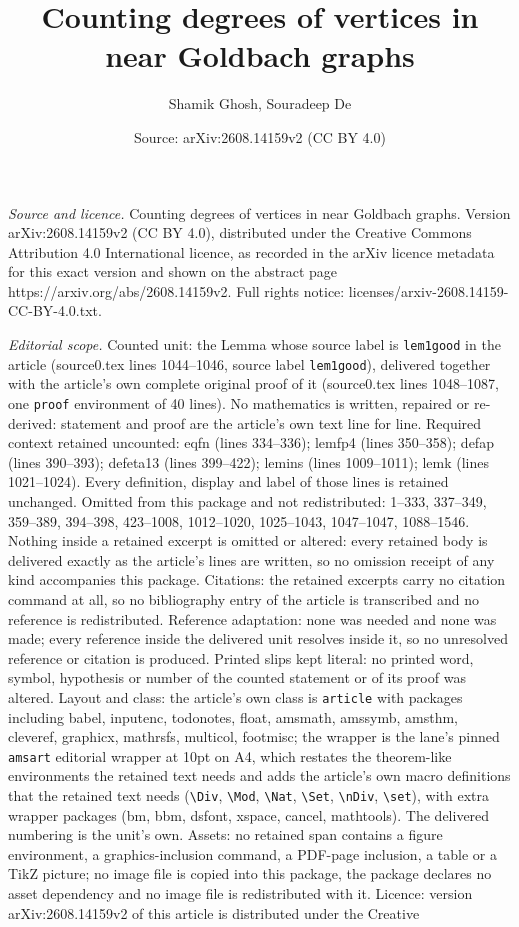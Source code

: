 \documentclass[10pt,a4paper]{amsart}
\title[Counting degrees of vertices in near Goldbach graphs]{Counting degrees of vertices in near Goldbach graphs}
\author{Shamik Ghosh, Souradeep De}
\date{Source: arXiv:2608.14159v2 (CC BY 4.0)}
\begin{document}
\maketitle

\noindent\emph{Source and licence.} Counting degrees of vertices in near Goldbach graphs. Version arXiv:2608.14159v2 (CC BY 4.0), distributed under the Creative Commons Attribution 4.0 International licence, as recorded in the arXiv licence metadata for this exact version and shown on the abstract page https://arxiv.org/abs/2608.14159v2. Full rights notice: licenses/arxiv-2608.14159-CC-BY-4.0.txt.\par\smallskip

\noindent\textit{Editorial scope.} Counted unit: the Lemma whose source label is \texttt{lem1good} in the article (source0.tex lines 1044--1046, source label \texttt{lem1good}), delivered together with the article's own complete original proof of it (source0.tex lines 1048--1087, one \texttt{proof} environment of 40 lines). No mathematics is written, repaired or re-derived: statement and proof are the article's own text line for line. Required context retained uncounted: eqfn (lines 334--336); lemfp4 (lines 350--358); defap (lines 390--393); defeta13 (lines 399--422); lemins (lines 1009--1011); lemk (lines 1021--1024). Every definition, display and label of those lines is retained unchanged. Omitted from this package and not redistributed: 1--333, 337--349, 359--389, 394--398, 423--1008, 1012--1020, 1025--1043, 1047--1047, 1088--1546. Nothing inside a retained excerpt is omitted or altered: every retained body is delivered exactly as the article's lines are written, so no omission receipt of any kind accompanies this package. Citations: the retained excerpts carry no citation command at all, so no bibliography entry of the article is transcribed and no reference is redistributed. Reference adaptation: none was needed and none was made; every reference inside the delivered unit resolves inside it, so no unresolved reference or citation is produced. Printed slips kept literal: no printed word, symbol, hypothesis or number of the counted statement or of its proof was altered. Layout and class: the article's own class is \texttt{article} with packages including babel, inputenc, todonotes, float, amsmath, amssymb, amsthm, cleveref, graphicx, mathrsfs, multicol, footmisc; the wrapper is the lane's pinned \texttt{amsart} editorial wrapper at 10pt on A4, which restates the theorem-like environments the retained text needs and adds the article's own macro definitions that the retained text needs (\texttt{\textbackslash Div}, \texttt{\textbackslash Mod}, \texttt{\textbackslash Nat}, \texttt{\textbackslash Set}, \texttt{\textbackslash nDiv}, \texttt{\textbackslash set}), with extra wrapper packages (bm, bbm, dsfont, xspace, cancel, mathtools). The delivered numbering is the unit's own. Assets: no retained span contains a figure environment, a graphics-inclusion command, a PDF-page inclusion, a table or a TikZ picture; no image file is copied into this package, the package declares no asset dependency and no image file is redistributed with it. Licence: version arXiv:2608.14159v2 of this article is distributed under the Creative 
\end{document}
